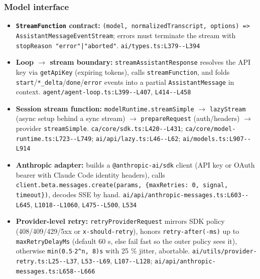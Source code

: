 \subsubsection*{Model interface}
\begin{itemize}
\item \textbf{\texttt{StreamFunction} contract:} \texttt{(\allowbreak{}model, normalizedTranscript, options) => AssistantMessageEventStream}; errors must terminate the stream with \texttt{stopReason "error"|"aborted"}. \texttt{ai/\allowbreak{}types.\allowbreak{}ts:\allowbreak{}L379-\allowbreak{}-\allowbreak{}L394}
\item \textbf{Loop $\rightarrow$ stream boundary:} \texttt{streamAssistantResponse} resolves the API key via \texttt{getApiKey} (expiring tokens), calls \texttt{streamFunction}, and folds \texttt{start}/\texttt{*\_\allowbreak{}delta}/\texttt{done}/\texttt{error} events into a partial \texttt{AssistantMessage} in context. \texttt{agent/\allowbreak{}agent-\allowbreak{}loop.\allowbreak{}ts:\allowbreak{}L399-\allowbreak{}-\allowbreak{}L407}, \texttt{L414-\allowbreak{}-\allowbreak{}L458}
\item \textbf{Session stream function:} \texttt{modelRuntime.\allowbreak{}streamSimple} $\rightarrow$ \texttt{lazyStream} (async setup behind a sync stream) $\rightarrow$ \texttt{prepareRequest} (auth/headers) $\rightarrow$ provider \texttt{streamSimple}. \texttt{ca/\allowbreak{}core/\allowbreak{}sdk.\allowbreak{}ts:\allowbreak{}L420-\allowbreak{}-\allowbreak{}L431}; \texttt{ca/\allowbreak{}core/\allowbreak{}model-\allowbreak{}runtime.\allowbreak{}ts:\allowbreak{}L723-\allowbreak{}-\allowbreak{}L749}; \texttt{ai/\allowbreak{}api/\allowbreak{}lazy.\allowbreak{}ts:\allowbreak{}L46-\allowbreak{}-\allowbreak{}L62}; \texttt{ai/\allowbreak{}models.\allowbreak{}ts:\allowbreak{}L907-\allowbreak{}-\allowbreak{}L914}
\item \textbf{Anthropic adapter:} builds a \texttt{@anthropic-\allowbreak{}ai/\allowbreak{}sdk} client (API key or OAuth bearer with Claude Code identity headers), calls \texttt{client.\allowbreak{}beta.\allowbreak{}messages.\allowbreak{}create(\allowbreak{}params, \{maxRetries:\allowbreak{} 0, signal, timeout\})}, decodes SSE by hand. \texttt{ai/\allowbreak{}api/\allowbreak{}anthropic-\allowbreak{}messages.\allowbreak{}ts:\allowbreak{}L603-\allowbreak{}-\allowbreak{}L645}, \texttt{L1018-\allowbreak{}-\allowbreak{}L1060}, \texttt{L475-\allowbreak{}-\allowbreak{}L500}, \texttt{L534}
\item \textbf{Provider-level retry:} \texttt{retryProviderRequest} mirrors SDK policy (408/409/429/5xx or \texttt{x-\allowbreak{}should-\allowbreak{}retry}), honors \texttt{retry-\allowbreak{}after(\allowbreak{}-\allowbreak{}ms)} up to \texttt{maxRetryDelayMs} (default 60 s, else fail fast so the outer policy sees it), otherwise \texttt{min(\allowbreak{}0.\allowbreak{}5$\cdot$2\textasciicircum{}n, 8)s} with 25 \% jitter, abortable. \texttt{ai/\allowbreak{}utils/\allowbreak{}provider-\allowbreak{}retry.\allowbreak{}ts:\allowbreak{}L25-\allowbreak{}-\allowbreak{}L37}, \texttt{L53-\allowbreak{}-\allowbreak{}L69}, \texttt{L107-\allowbreak{}-\allowbreak{}L128}; \texttt{ai/\allowbreak{}api/\allowbreak{}anthropic-\allowbreak{}messages.\allowbreak{}ts:\allowbreak{}L658-\allowbreak{}-\allowbreak{}L666}

\end{itemize}

